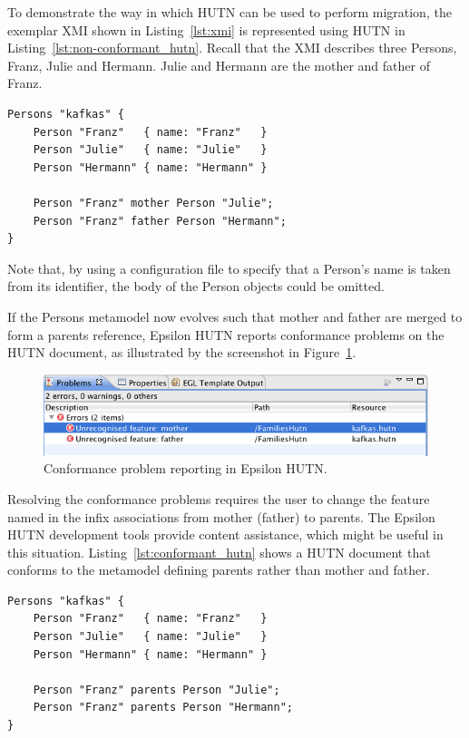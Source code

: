To demonstrate the way in which HUTN can be used to perform migration, the exemplar XMI shown in Listing~\ref{lst:xmi} is represented using HUTN in Listing~\ref{lst:non-conformant_hutn}. Recall that the XMI describes three Persons, Franz, Julie and Hermann. Julie and Hermann are the mother and father of Franz.

\begin{lstlisting}[caption=HUTN for people with mothers and fathers., label=lst:non-conformant_hutn, language=HutnFamilies]
Persons "kafkas" {
    Person "Franz"   { name: "Franz"   }
    Person "Julie"   { name: "Julie"   }
    Person "Hermann" { name: "Hermann" }
    
    Person "Franz" mother Person "Julie";
    Person "Franz" father Person "Hermann";
}
\end{lstlisting}

Note that, by using a configuration file to specify that a Person's name is taken from its identifier, the body of the Person objects could be omitted.

If the Persons metamodel now evolves such that mother and father are merged to form a parents reference, Epsilon HUTN reports conformance problems on the HUTN document, as illustrated by the screenshot in Figure~\ref{fig:hutn_conformance_reporting}.

\begin{figure}[htbp]
  \begin{center}
    \leavevmode
    \includegraphics[scale=0.44]{5.Implementation/hutn_conformance_reporting.png}
  \end{center}
  \caption{Conformance problem reporting in Epsilon HUTN.}
  \label{fig:hutn_conformance_reporting}
\end{figure}

Resolving the conformance problems requires the user to change the feature named in the infix associations from mother (father) to parents. The Epsilon HUTN development tools provide content assistance, which might be useful in this situation. Listing~\ref{lst:conformant_hutn} shows a HUTN document that conforms to the metamodel defining parents rather than mother and father.

\begin{lstlisting}[caption=HUTN for people with parents., label=lst:conformant_hutn, language=HutnFamilies]
Persons "kafkas" {
    Person "Franz"   { name: "Franz"   }
    Person "Julie"   { name: "Julie"   }
    Person "Hermann" { name: "Hermann" }
    
    Person "Franz" parents Person "Julie";
    Person "Franz" parents Person "Hermann";
}
\end{lstlisting}


